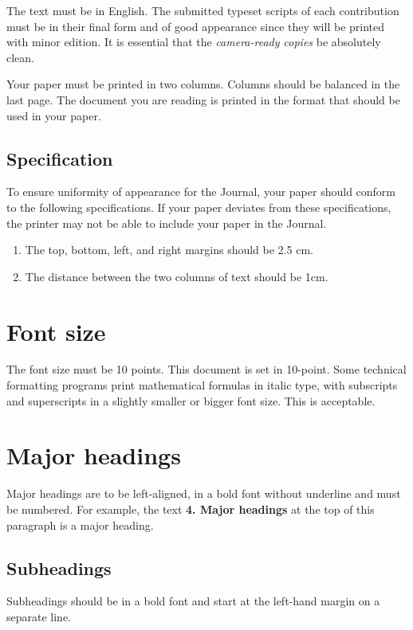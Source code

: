\documentclass{jcst}
\begin{document}
The text must be in English. The submitted typeset scripts of each contribution must be in their final form and of good appearance since they will be printed with minor edition. It is essential that the \textit{camera-ready copies} be absolutely clean.

Your paper must be printed in two columns. Columns should be balanced in the last page. The document you are reading is printed in the format that should be used in your paper.

\subsection{Specification}

To ensure uniformity of appearance for the Journal, your paper should conform to
 the following specifications. If your paper deviates from these
 specifications, the printer may not be able to include your paper in the Journal.

\begin{enumerate}
\item The top, bottom, left, and right margins should be 2.5 cm.
\item The distance between the two columns of text should be 1cm.
\end{enumerate}

\section{Font size}
The font size must be 10 points. This document is set in 10-point. Some technical
formatting programs print mathematical formulas in italic type, with subscripts
and superscripts in a slightly smaller or bigger font size. This is acceptable.

\section{Major headings}

Major headings are to be left-aligned, in a bold font without underline and
must be numbered. For example, the text
 \textbf{4. Major headings} at the top of this paragraph is a major heading.

\subsection{Subheadings}
Subheadings should be in a bold font and start at the left-hand margin on a separate line.
\end{document}
